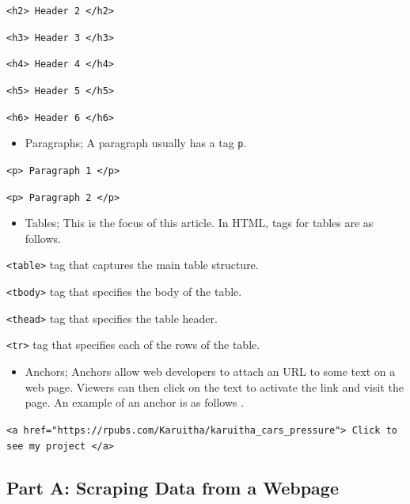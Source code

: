 \documentclass[]{tufte-handout}
\providecommand{\tightlist}{%
  \setlength{\itemsep}{0pt}\setlength{\parskip}{0pt}}
\begin{document}
\texttt{\textless{}h2\textgreater{}\ Header\ 2\ \textless{}/h2\textgreater{}}

\texttt{\textless{}h3\textgreater{}\ Header\ 3\ \textless{}/h3\textgreater{}}

\texttt{\textless{}h4\textgreater{}\ Header\ 4\ \textless{}/h4\textgreater{}}

\texttt{\textless{}h5\textgreater{}\ Header\ 5\ \textless{}/h5\textgreater{}}

\texttt{\textless{}h6\textgreater{}\ Header\ 6\ \textless{}/h6\textgreater{}}

\begin{itemize}
\tightlist
\item
  Paragraphs; A paragraph usually has a tag \texttt{p}.
\end{itemize}

\texttt{\textless{}p\textgreater{}\ Paragraph\ 1\ \textless{}/p\textgreater{}}

\texttt{\textless{}p\textgreater{}\ Paragraph\ 2\ \textless{}/p\textgreater{}}

\begin{itemize}
\tightlist
\item
  Tables; This is the focus of this article. In HTML, tags for tables
  are as follows.
\end{itemize}

\texttt{\textless{}table\textgreater{}} tag that captures the main table
structure.

\texttt{\textless{}tbody\textgreater{}} tag that specifies the body of
the table.

\texttt{\textless{}thead\textgreater{}} tag that specifies the table
header.

\texttt{\textless{}tr\textgreater{}} tag that specifies each of the rows
of the table.

\begin{itemize}
\tightlist
\item
  Anchors; Anchors allow web developers to attach an URL to some text on
  a web page. Viewers can then click on the text to activate the link
  and visit the page. An example of an anchor is as follows
  \citep{macaulay2017introduction}.
\end{itemize}

\texttt{\textless{}a\ href="https://rpubs.com/Karuitha/karuitha\_cars\_pressure"\textgreater{}\ Click\ to\ see\ my\ project\ \textless{}/a\textgreater{}}

\hypertarget{part-a-scraping-data-from-a-webpage}{%
\subsection{\texorpdfstring{\textbf{Part A: Scraping Data from a
Webpage}}{Part A: Scraping Data from a Webpage}}\label{part-a-scraping-data-from-a-webpage}}
\end{document}
